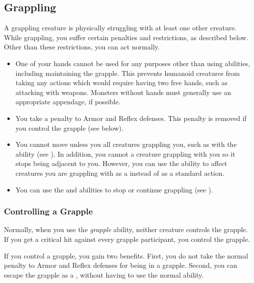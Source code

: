   \subsection{Grappling}\label{Grappling}
    A grappling creature is physically struggling with at least one other creature.
    While grappling, you suffer certain penalties and restrictions, as described below.
    Other than these restrictions, you can act normally.
    \begin{itemize}
      \item One of your hands cannot be used for any purposes other than using  abilities, including maintaining the grapple.
        This prevents humanoid creatures from taking any actions which would require having two free hands, such as attacking with  weapons.
        Monsters without hands must generally use an appropriate appendage, if possible.
      \item You take a  penalty to Armor and Reflex defenses.
        This penalty is removed if you control the grapple (see below).
      \item You cannot move unless you  all creatures grappling you, such as with the  ability (see ).
        In addition, you cannot  a creature grappling with you so it stops being adjacent to you.
        However, you can use the  ability to affect creatures you are grappling with as a  instead of as a standard action.
      \item You can use the  and  abilities to stop or continue grappling (see ).
    \end{itemize}

    \subsubsection{Controlling a Grapple}\label{Controlling a Grapple}
      Normally, when you use the \textit{grapple} ability, neither creature controls the grapple.
      If you get a critical hit against every grapple participant, you control the grapple.

      If you control a grapple, you gain two benefits.
      First, you do not take the normal  penalty to Armor and Reflex defenses for being in a grapple.
      Second, you can escape the grapple as a , without having to use the normal  ability.

